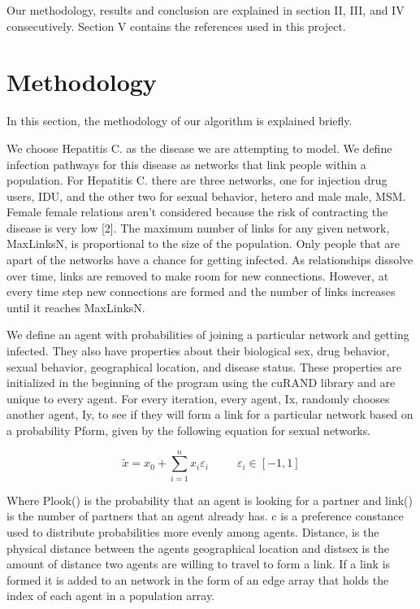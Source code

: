 \documentclass[conference]{IEEEtran}
\begin{document}
Our methodology, results and conclusion are explained in section II, III, and IV consecutively. Section V contains the references used in this project. 

\section{Methodology}
In this section, the methodology of our algorithm is explained briefly.\par
We choose Hepatitis C. as the disease we are attempting to model. We define infection pathways for this disease as networks that link people within a population. For Hepatitis C. there are three networks, one for injection drug users, IDU, and the other two for sexual behavior, hetero and male male, MSM. Female female relations aren’t considered because the risk of contracting the disease is very low [2]. The maximum number of links for any given network, MaxLinksN, is proportional to the size of the population. Only people that are apart of the networks have a chance for getting infected. As relationships dissolve over time, links are removed to make room for new connections. However, at every time step new connections are formed and the number of links increases until it reaches MaxLinksN.\par
We define an agent with probabilities of joining a particular network and getting infected. They also have properties about their biological sex, drug behavior, sexual behavior, geographical location, and disease status. These properties are initialized in the beginning of the program using the cuRAND library and are unique to every agent.  For every iteration, every agent, Ix,  randomly chooses another agent, Iy, to see if they will form a link for a particular network based on a probability Pform, given by the following equation for sexual networks.\par

\begin{equation}
\label{eq1}
\tilde{x} =x_0 + \sum\limits_{i=1}^{n} {x_i\varepsilon_i} \;\;\;\;\;\;\;\;\;  \varepsilon_i\in [-1,1]
\end{equation}

Where Plook() is the probability that an agent is looking for a partner and link() is the number of partners that an agent already has. c is a preference constance used to distribute probabilities more evenly among agents. Distance, is the physical distance between the agents geographical location and distsex is the amount of distance two agents are willing to travel to form a link.  If a link is formed it is added to an network in the form of an edge array that holds the index of each agent in a population array. \par
 
\end{document}
